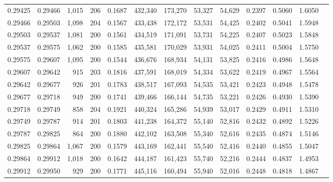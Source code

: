 \begin{tabular}{rrrrrrrrrrrrr}
0.29425 & 0.29466 & 1,015 & 206 &                                     0.1687 & 432,340 & 173,270 &  53,327 &  54,629 & 0.2397 & 0.5060 & 1.6050 \\
0.29466 & 0.29503 & 1,098 & 204 &                                     0.1567 & 433,438 & 172,172 &  53,531 &  54,425 & 0.2402 & 0.5041 & 1.5948 \\
0.29503 & 0.29537 & 1,081 & 200 &                                     0.1561 & 434,519 & 171,091 &  53,731 &  54,225 & 0.2407 & 0.5023 & 1.5848 \\
0.29537 & 0.29575 & 1,062 & 200 &                                     0.1585 & 435,581 & 170,029 &  53,931 &  54,025 & 0.2411 & 0.5004 & 1.5750 \\
0.29575 & 0.29607 & 1,095 & 200 &                                     0.1544 & 436,676 & 168,934 &  54,131 &  53,825 & 0.2416 & 0.4986 & 1.5648 \\
0.29607 & 0.29642 &   915 & 203 &                                     0.1816 & 437,591 & 168,019 &  54,334 &  53,622 & 0.2419 & 0.4967 & 1.5564 \\
0.29642 & 0.29677 &   926 & 201 &                                     0.1783 & 438,517 & 167,093 &  54,535 &  53,421 & 0.2423 & 0.4948 & 1.5478 \\
0.29677 & 0.29718 &   949 & 200 &                                     0.1741 & 439,466 & 166,144 &  54,735 &  53,221 & 0.2426 & 0.4930 & 1.5390 \\
0.29718 & 0.29749 &   858 & 204 &                                     0.1921 & 440,324 & 165,286 &  54,939 &  53,017 & 0.2429 & 0.4911 & 1.5310 \\
0.29749 & 0.29787 &   914 & 201 &                                     0.1803 & 441,238 & 164,372 &  55,140 &  52,816 & 0.2432 & 0.4892 & 1.5226 \\
0.29787 & 0.29825 &   864 & 200 &                                     0.1880 & 442,102 & 163,508 &  55,340 &  52,616 & 0.2435 & 0.4874 & 1.5146 \\
0.29825 & 0.29864 & 1,067 & 200 &                                     0.1579 & 443,169 & 162,441 &  55,540 &  52,416 & 0.2440 & 0.4855 & 1.5047 \\
0.29864 & 0.29912 & 1,018 & 200 &                                     0.1642 & 444,187 & 161,423 &  55,740 &  52,216 & 0.2444 & 0.4837 & 1.4953 \\
0.29912 & 0.29950 &   929 & 200 &                                     0.1771 & 445,116 & 160,494 &  55,940 &  52,016 & 0.2448 & 0.4818 & 1.4867 \\

\end{tabular}
